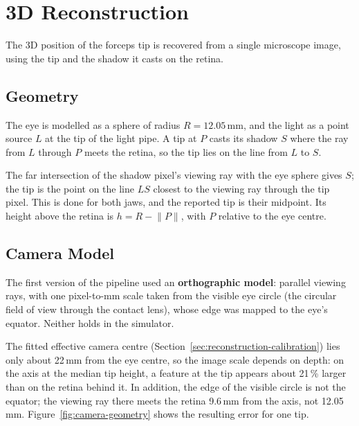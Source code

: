 
\section{3D Reconstruction}
\label{sec:reconstruction}

The 3D position of the forceps tip is recovered from a single microscope image, using the tip and the shadow it
casts on the retina.

\subsection{Geometry}
\label{sec:reconstruction-geometry}

The eye is modelled as a sphere of radius $R = 12.05$\,mm, and the light as a point source $L$ at the tip of the
light pipe. A tip at $P$ casts its shadow $S$ where the ray from $L$ through $P$ meets the retina, so the tip lies on
the line from $L$ to $S$.

The far intersection of the shadow pixel's viewing ray with the eye sphere gives $S$; the tip is the point on
the line $LS$ closest to the viewing ray through the tip pixel. This is done for both jaws, and the reported tip is
their midpoint. Its height above the retina is $h = R - \lVert P \rVert$, with $P$ relative to the eye centre.

\subsection{Camera Model}
\label{sec:reconstruction-camera}

The first version of the pipeline used an \textbf{orthographic model}: parallel viewing rays, with one pixel-to-mm
scale taken from the visible eye circle (the circular field of view through the contact lens), whose edge was mapped to the eye's equator. Neither holds in the simulator.

The fitted effective camera centre (Section~\ref{sec:reconstruction-calibration}) lies only about 22\,mm from the
eye centre, so the image scale depends on depth: on the axis at the median tip height, a feature at the tip appears
about 21\,\% larger than on the retina behind it.
In addition, the edge of the visible circle is not the equator; the viewing
ray there meets the retina 9.6\,mm from the axis, not 12.05\,mm. Figure~\ref{fig:camera-geometry} shows the resulting error for
one tip.

